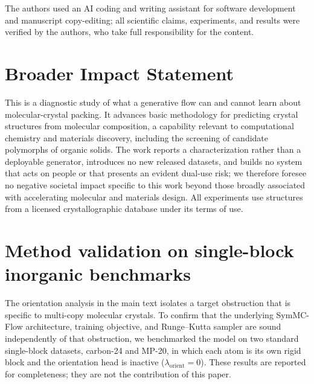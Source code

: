 \documentclass[10pt]{article}
\begin{document}
The authors used an AI coding and writing assistant for software development and
manuscript copy-editing; all scientific claims, experiments, and results were
verified by the authors, who take full responsibility for the content.

\section*{Broader Impact Statement}
This is a diagnostic study of what a generative flow can and cannot learn about
molecular-crystal packing. It advances basic methodology for predicting crystal
structures from molecular composition, a capability relevant to computational
chemistry and materials discovery, including the screening of candidate
polymorphs of organic solids. The work reports a characterization rather than a
deployable generator, introduces no new released datasets, and builds no system
that acts on people or that presents an evident dual-use risk; we therefore
foresee no negative societal impact specific to this work beyond those broadly
associated with accelerating molecular and materials design. All experiments use
structures from a licensed crystallographic database under its terms of use.




\appendix
\renewcommand{\thetable}{A\arabic{table}}
\renewcommand{\thefigure}{A\arabic{figure}}
\renewcommand{\theHtable}{app.table.\arabic{table}}
\renewcommand{\theHfigure}{app.figure.\arabic{figure}}
\setcounter{table}{0}
\setcounter{figure}{0}

\section{Method validation on single-block inorganic benchmarks}
\label{app:inorganic}

The orientation analysis in the main text isolates a target obstruction that is
specific to multi-copy molecular crystals. To confirm that the underlying
SymMC-Flow architecture, training objective, and Runge--Kutta sampler are sound
independently of that obstruction, we benchmarked the model on two standard
single-block datasets, carbon-24 and MP-20, in which each atom is its own rigid
block and the orientation head is inactive ($\lambda_{\text{orient}}=0$). These
results are reported for completeness; they are not the contribution of this
paper.
\end{document}
